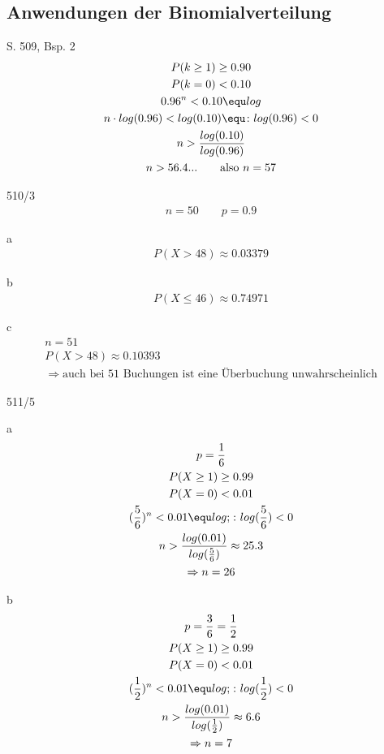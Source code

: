 \subsection{Anwendungen der Binomialverteilung}
S. 509, Bsp. 2
\begin{gather*}
  P(k \geq 1) \geq 0.90 \\
  P(k = 0) < 0.10 \\
  0.96^n < 0.10 \equ log \\
  n \cdot log(0.96) < log(0.10) \equ \colon log(0.96) < 0 \\
  n > \frac{log(0.10)}{log(0.96)} \\
  n > 56.4... \qquad \text{also } n = 57
\end{gather*}
\begin{exercise}{510/3}
  \begin{gather*}
    n = 50 \qquad p = 0.9
  \end{gather*}
  \item [a]
  \begin{gather*}
    P(X > 48) \approx 0.03379
  \end{gather*}
  \item [b]
  \begin{gather*}
    P(X \leq 46) \approx 0.74971
  \end{gather*}
  \item [c]
  \begin{gather*}
    n = 51 \\
    P(X > 48) \approx 0.10393 \\
    \Rightarrow \text{auch bei $51$ Buchungen ist eine Überbuchung unwahrscheinlich}
  \end{gather*}
\end{exercise}
\begin{exercise}{511/5}
  \item [a]
  \begin{gather*}
    p = \frac{1}{6} \\
    P(X \geq 1) \geq 0.99 \\
    P(X = 0) < 0.01 \\
    (\frac{5}{6})^n < 0.01 \equ log; \colon log(\frac{5}{6}) < 0 \\
    n > \frac{log(0.01)}{log(\frac{5}{6})} \approx 25.3 \\
    \Rightarrow n = 26
  \end{gather*}
  \item [b]
  \begin{gather*}
    p = \frac{3}{6} = \frac{1}{2} \\
    P(X \geq 1) \geq 0.99 \\
    P(X = 0) < 0.01 \\
    (\frac{1}{2})^n < 0.01 \equ log; \colon log(\frac{1}{2}) < 0 \\
    n > \frac{log(0.01)}{log(\frac{1}{2})} \approx 6.6 \\
    \Rightarrow n = 7
  \end{gather*}
\end{exercise}
